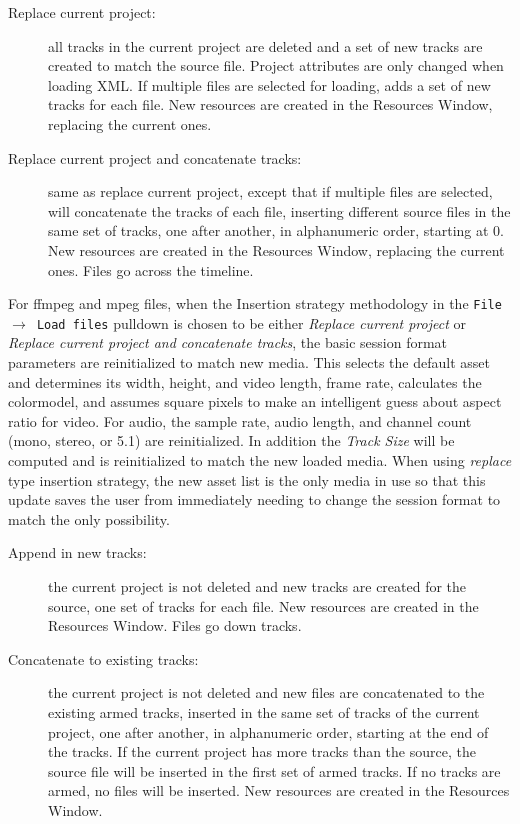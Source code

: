 \begin{description}
    \begin{description}
       \item [Replace current project:] all tracks in the current project are deleted and a set of new tracks are created to match the source file.  Project attributes are only changed when loading XML\@. If multiple files are selected for loading, \CGG{} adds a set of new tracks for each file. New resources are created in the Resources Window, replacing the current ones.
       \item [Replace current project and concatenate tracks: ] same as replace current project, except that if multiple files are selected, \CGG{} will concatenate the tracks of each file, inserting different source files in the same set of tracks, one after another, in alphanumeric order, starting at 0. New resources are created in the Resources Window, replacing the current ones.  Files go across the timeline.
    \end{description}
    For ffmpeg and mpeg files, when the Insertion strategy methodology in the \texttt{File $\rightarrow$ Load files} pulldown is chosen to be either \textit{Replace current project} or \textit{Replace current project and concatenate tracks}, the basic session format parameters are reinitialized to match new media.  This selects the default asset and determines its width, height, and video length, frame rate, calculates the colormodel, and assumes square pixels to make an intelligent guess about aspect ratio for video.  For audio, the sample rate, audio length, and channel count (mono, stereo, or 5.1) are reinitialized.  In addition the \textit{Track Size} will be computed and is reinitialized to match the new loaded media.  When using \textit{replace} type insertion strategy, the new asset list is the only media in use so that this update saves the user from immediately needing to change the session format to match the only possibility.
    \begin{description}
        \item[Append in new tracks:] the current project is not deleted and new tracks are created for the source, one set of tracks for each file. New resources are created in the Resources Window.  Files go down tracks.
        \item[Concatenate to existing tracks:]  the current project is not deleted and new files are concatenated to the existing armed tracks, inserted in the same set of tracks of the current project, one after another, in     alphanumeric order, starting at the end of the tracks. If the current project has more tracks than the source, the source file will be inserted in the first set of armed tracks. If no tracks are armed, no files will be inserted. New resources are created in the Resources Window.

\end{description}
\end{description}
